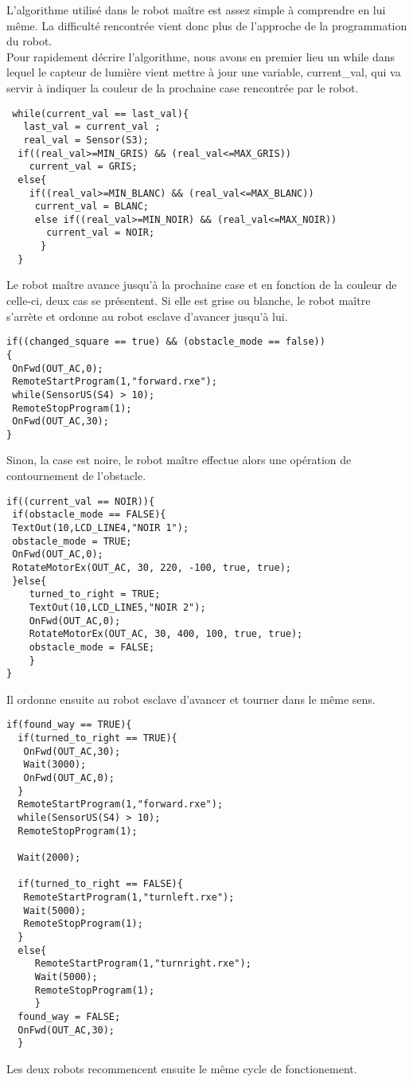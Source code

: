 L'algorithme utilisé dans le robot maître est assez simple à comprendre
en lui même. La difficulté rencontrée vient donc plus de l'approche de la
programmation du robot.
\\
Pour rapidement décrire l'algorithme, nous avons en premier lieu un
while dans lequel le capteur de lumière
vient mettre à jour une variable, current\_val, qui va servir à indiquer la couleur de la prochaine
case rencontrée par le robot.

\begin{verbatim} 
 while(current_val == last_val){
   last_val = current_val ;
   real_val = Sensor(S3);
  if((real_val>=MIN_GRIS) && (real_val<=MAX_GRIS))
    current_val = GRIS;
  else{
    if((real_val>=MIN_BLANC) && (real_val<=MAX_BLANC))
     current_val = BLANC;
     else if((real_val>=MIN_NOIR) && (real_val<=MAX_NOIR))
       current_val = NOIR;
      }
  } 
\end{verbatim}

Le robot maître avance jusqu'à la prochaine case et en fonction de la
couleur de celle-ci, deux cas se présentent.
Si elle est grise ou blanche, le robot maître s'arrète et ordonne au
robot esclave d'avancer jusqu'à lui.

\begin{verbatim}
if((changed_square == true) && (obstacle_mode == false))
{
 OnFwd(OUT_AC,0);
 RemoteStartProgram(1,"forward.rxe");
 while(SensorUS(S4) > 10);
 RemoteStopProgram(1);
 OnFwd(OUT_AC,30);
}
\end{verbatim}

Sinon, la case est noire, le robot maître effectue alors une opération de contournement
de l'obstacle.

\begin{verbatim} 
if((current_val == NOIR)){
 if(obstacle_mode == FALSE){
 TextOut(10,LCD_LINE4,"NOIR 1");
 obstacle_mode = TRUE;
 OnFwd(OUT_AC,0);
 RotateMotorEx(OUT_AC, 30, 220, -100, true, true);
 }else{
    turned_to_right = TRUE;
    TextOut(10,LCD_LINE5,"NOIR 2");
    OnFwd(OUT_AC,0);
    RotateMotorEx(OUT_AC, 30, 400, 100, true, true);
    obstacle_mode = FALSE;
    }
}
\end{verbatim}

Il ordonne ensuite au robot esclave d'avancer et tourner dans le même
sens. 

\begin{verbatim}
if(found_way == TRUE){
  if(turned_to_right == TRUE){
   OnFwd(OUT_AC,30);
   Wait(3000);
   OnFwd(OUT_AC,0);
  }
  RemoteStartProgram(1,"forward.rxe");
  while(SensorUS(S4) > 10);
  RemoteStopProgram(1);
 
  Wait(2000);
 
  if(turned_to_right == FALSE){
   RemoteStartProgram(1,"turnleft.rxe");
   Wait(5000);
   RemoteStopProgram(1);
  }
  else{
     RemoteStartProgram(1,"turnright.rxe");
     Wait(5000);
     RemoteStopProgram(1);
     }
  found_way = FALSE;
  OnFwd(OUT_AC,30);
  }
\end{verbatim}

Les deux robots recommencent ensuite le même cycle de fonctionement.